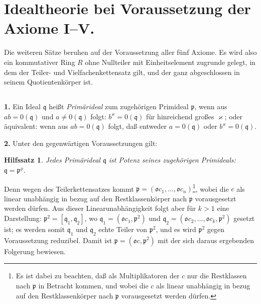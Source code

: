 \documentclass[12pt,a4paper]{article}
\theoremstyle{plain}
\newtheorem{Hilfssatz}[Satz]{Hilfssatz}
\theoremstyle{definition}
\theoremstyle{remark}
\begin{document}
\newpage
\section{Idealtheorie bei Voraussetzung der Axiome I--V.}

\noindent
Die weiteren Sätze beruhen auf der Voraussetzung aller fünf Axiome. Es wird also ein kommutativer Ring $R$ ohne Nullteiler mit Einheitselement zugrunde gelegt, in dem der Teiler- und Vielfachenkettensatz gilt, und der ganz abgeschlossen in seinem Quotientenkörper ist.

\setcounter{Satz}{0}
\subsection{}

\noindent
\textbf{1.} Ein Ideal $\mathfrak{q}$ heißt \textit{Primärideal} zum zugehörigen Primideal $\mathfrak{p}$, wenn aus $ab = 0(\mathfrak{q})$ und $a \neq 0(\mathfrak{q})$ folgt: $b^{\varkappa} = 0(\mathfrak{q})$ für hinreichend großes $\varkappa$; oder äquivalent: wenn aus $ab = 0(\mathfrak{q})$ folgt, daß entweder $a = 0(\mathfrak{q})$ oder $b^{\varkappa} = 0(\mathfrak{q})$.

\medskip
\noindent
\textbf{2.} Unter den gegenwärtigen Voraussetzungen gilt:

\begin{Hilfssatz}
Jedes Primärideal $\mathfrak{q}$ ist Potenz seines zugehörigen Primideals: $\mathfrak{q} = \mathfrak{p}^{\varrho}$.
\end{Hilfssatz}

Denn wegen des Teilerkettensatzes kommt $\mathfrak{p} = (\mathfrak{o}c_{1},\dots, \mathfrak{o}c_{n})$\footnote{Es ist dabei zu beachten, daß als Multiplikatoren der $c$ nur die Restklassen nach $\mathfrak{p}$ in Betracht kommen, und wobei die $c$ als linear unabhängig in bezug auf den Restklassenkörper nach $\mathfrak{p}$ vorausgesetzt werden dürfen.}, wobei die $c$ als linear unabhängig in bezug auf den Restklassenkörper nach $\mathfrak{p}$ vorausgesetzt werden dürfen. Aus dieser Linearunabhängigkeit folgt aber für $k > 1$ eine Darstellung: $\mathfrak{p}^{2} = [\mathfrak{q}_{1}, \mathfrak{q}_{2}]$, wo $\mathfrak{q}_{1} = (\mathfrak{o}c_{1}, \mathfrak{p}^{2})$ und $\mathfrak{q}_{2} = (\mathfrak{o}c_{2},\dots, \mathfrak{o}c_{k}, \mathfrak{p}^{2})$ gesetzt ist; es werden somit $\mathfrak{q}_{1}$ und $\mathfrak{q}_{2}$ echte Teiler von $\mathfrak{p}^{2}$, und es wird $\mathfrak{p}^{2}$ gegen Voraussetzung reduzibel. Damit ist $\mathfrak{p} = (\mathfrak{o}c, \mathfrak{p}^{2})$ mit der sich daraus ergebenden Folgerung bewiesen.
\end{document}
